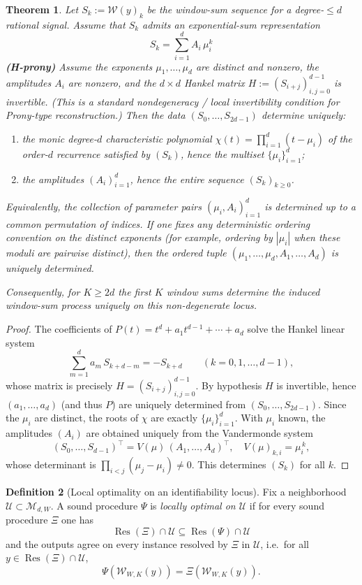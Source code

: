 \documentclass[11pt,reqno]{amsart}
\newtheorem{theorem}{Theorem}[section]
\theoremstyle{definition}
\newtheorem{definition}[theorem]{Definition}
\theoremstyle{remark}
\newcommand{\1}{\mathbf{1}}
\begin{document}
\begin{theorem}\label{thm:window-ident-global}
Let $S_k:=\mathcal W(y)_k$ be the window-sum sequence for a degree-$\le d$ rational signal.
Assume that $S_k$ admits an exponential-sum representation
\[
S_k=\sum_{i=1}^d A_i\,\mu_i^k
\]
\noindent\textbf{(H-prony)}\; Assume the exponents $\mu_1,\dots,\mu_d$ are distinct and nonzero, the amplitudes $A_i$ are nonzero, and the $d\times d$ Hankel matrix $H:=(S_{i+j})_{i,j=0}^{d-1}$ is invertible. (This is a standard nondegeneracy / local invertibility condition for Prony-type reconstruction.)
Then the data $(S_0,\dots,S_{2d-1})$ determine uniquely:
\begin{enumerate}
\item the monic degree-$d$ characteristic polynomial $\chi(t)=\prod_{i=1}^d(t-\mu_i)$ of the order-$d$ recurrence satisfied by $(S_k)$, hence the multiset $\{\mu_i\}_{i=1}^d$;
\item the amplitudes $(A_i)_{i=1}^d$, hence the entire sequence $(S_k)_{k\ge 0}$.
\end{enumerate}
Equivalently, the collection of parameter pairs $(\mu_i,A_i)_{i=1}^d$ is determined up to a common permutation of indices. If one fixes any deterministic ordering convention on the distinct exponents (for example, ordering by $|\mu_i|$ when these moduli are pairwise distinct), then the ordered tuple $(\mu_1,\dots,\mu_d,A_1,\dots,A_d)$ is uniquely determined.

Consequently, for $K\ge 2d$ the first $K$ window sums determine the induced window-sum process uniquely on this non-degenerate locus.
\end{theorem}

\begin{proof}
The coefficients of $P(t)=t^d+a_1 t^{d-1}+\cdots+a_d$ solve the Hankel linear system
\[
\sum_{m=1}^d a_m\,S_{k+d-m}=-S_{k+d}\qquad (k=0,1,\dots,d-1),
\]
whose matrix is precisely $H=(S_{i+j})_{i,j=0}^{d-1}$. By hypothesis $H$ is invertible, hence
$(a_1,\dots,a_d)$ (and thus $P$) are uniquely determined from $(S_0,\dots,S_{2d-1})$.
Since the $\mu_i$ are distinct, the roots of $\chi$ are exactly $\{\mu_i\}_{i=1}^d$.
With $\mu_i$ known, the amplitudes $(A_i)$ are obtained uniquely from the Vandermonde system
\[
(S_0,\dots,S_{d-1})^\top = V(\mu)\,(A_1,\dots,A_d)^\top,
\quad V(\mu)_{k,i}=\mu_i^{\,k},
\]
whose determinant is $\prod_{i<j}(\mu_j-\mu_i)\neq 0$. This determines $(S_k)$ for all $k$.
\end{proof}


\begin{definition}[Local optimality on an identifiability locus]\label{def:local-optimal}
Fix a neighborhood $\mathcal{U}\subset\mathcal{M}_{d,W}$.
A sound procedure $\Psi$ is \emph{locally optimal on $\mathcal{U}$} if for every sound procedure $\Xi$ one has
\[
\operatorname{Res}(\Xi)\cap\mathcal{U}\subseteq \operatorname{Res}(\Psi)\cap\mathcal{U}
\]
and the outputs agree on every instance resolved by $\Xi$ in $\mathcal{U}$, i.e.\ for all $y\in \operatorname{Res}(\Xi)\cap\mathcal{U}$,
\[
\Psi(\mathcal{W}_{W,K}(y))=\Xi(\mathcal{W}_{W,K}(y)).
\]
\end{definition}
\end{document}
